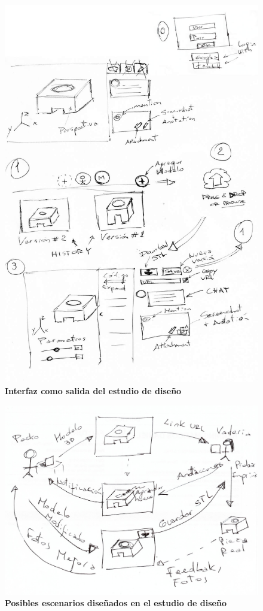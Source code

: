 \begin{figure}[h]
\includegraphics[width=14cm]{Img/UX/edc.jpg}
\centering
\caption{\textbf{ \footnotesize{Interfaz como salida del estudio de diseño}}}
\end{figure}


\begin{figure}[h]
\includegraphics[width=14cm]{Img/UX/ed2.jpg}
\centering
\caption{\textbf{ \footnotesize{Posibles escenarios diseñados en el estudio de diseño}}}
\end{figure}

